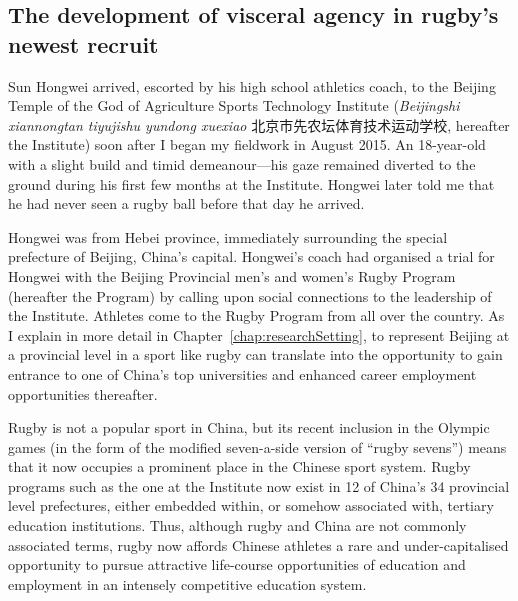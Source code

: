                                   \begin{CJK}{UTF8}{gbsn}

\section{The development of visceral agency in rugby's newest recruit\label{sect:SHW}}
Sun Hongwei arrived, escorted by his high school athletics coach, to the Beijing Temple of the God of Agriculture Sports Technology Institute (\textit{Beijingshi xiannongtan tiyujishu yundong xuexiao} 北京市先农坛体育技术运动学校,
hereafter the Institute) soon after I began my fieldwork in August 2015.  An 18-year-old with a slight build and timid demeanour---his gaze remained diverted to the ground during his first few months at the Institute.  Hongwei later told me that he had never seen a rugby ball before that day he arrived.

Hongwei was from Hebei province, immediately surrounding the special prefecture of Beijing, China's capital.  Hongwei's coach had organised a trial for Hongwei with the Beijing Provincial men's and women's Rugby Program (hereafter the Program) by calling upon social connections to the leadership of the Institute.  Athletes come to the Rugby Program from all over the country.  As I explain in more detail in Chapter~\ref{chap:researchSetting}, to represent Beijing at a provincial level in a sport like rugby can translate into the opportunity to gain entrance to one of China's top universities and enhanced career employment opportunities thereafter.

Rugby is not a popular sport in China, but its recent inclusion in the Olympic games (in the form of the modified seven-a-side version of ``rugby sevens'') means that it now occupies a prominent place in the Chinese sport system.  Rugby programs such as the one at the Institute now exist in 12 of China's 34 provincial level prefectures, either embedded within, or somehow associated with, tertiary education institutions.  Thus, although rugby and China are not commonly associated terms, rugby now affords Chinese athletes a rare and under-capitalised opportunity to pursue attractive life-course opportunities of education and employment in an intensely competitive education system.


\end{CJK}
